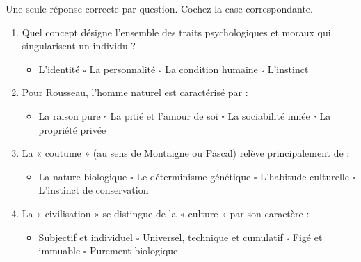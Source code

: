 \documentclass[11pt]{article}
\begin{document}
\begin{exercice}
Une seule réponse correcte par question. Cochez la case correspondante.
\begin{enumerate}
    \item Quel concept désigne l'ensemble des traits psychologiques et moraux qui singularisent un individu ?
    \begin{itemize}
        \item[$\square$] L'identité \quad $\square$ La personnalité \quad $\square$ La condition humaine \quad $\square$ L'instinct
    \end{itemize}
    \item Pour Rousseau, l'homme naturel est caractérisé par :
    \begin{itemize}
        \item[$\square$] La raison pure \quad $\square$ La pitié et l'amour de soi \quad $\square$ La sociabilité innée \quad $\square$ La propriété privée
    \end{itemize}
    \item La « coutume » (au sens de Montaigne ou Pascal) relève principalement de :
    \begin{itemize}
        \item[$\square$] La nature biologique \quad $\square$ Le déterminisme génétique \quad $\square$ L'habitude culturelle \quad $\square$ L'instinct de conservation
    \end{itemize}
    \item La « civilisation » se distingue de la « culture » par son caractère :
    \begin{itemize}
        \item[$\square$] Subjectif et individuel \quad $\square$ Universel, technique et cumulatif \quad $\square$ Figé et immuable \quad $\square$ Purement biologique
    \end{itemize}
\end{enumerate}
\end{exercice}
\end{document}
